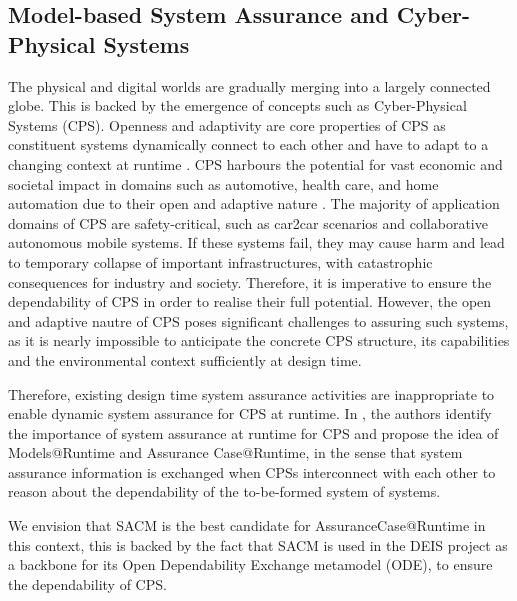 \subsection{Model-based System Assurance and Cyber-Physical Systems}

The physical and digital worlds are gradually merging into a largely connected globe. 
This is backed by the emergence of concepts such as Cyber-Physical Systems (CPS).
Openness and adaptivity are core properties of CPS as constituent systems dynamically connect to each other and have to adapt to a changing context at runtime \cite{trapp2013safety}.
CPS harbours the potential for vast economic and societal impact in domains such as automotive, health care, and home automation due to their open and adaptive nature \cite{wei2017deis}.
The majority of application domains of CPS are safety-critical, such as car2car scenarios and collaborative autonomous mobile systems.
If these systems fail, they may cause harm and lead to temporary collapse of important infrastructures, with catastrophic consequences for industry and society.
Therefore, it is imperative to ensure the dependability of CPS in order to realise their full potential. 
However, the open and adaptive nautre of CPS poses significant challenges to assuring such systems, as it is nearly impossible to anticipate the concrete CPS structure, its capabilities and the environmental context sufficiently at design time.

Therefore, existing design time system assurance activities are inappropriate to enable dynamic system assurance for CPS at runtime. 
In \cite{trapp2013safety}, the authors identify the importance of system assurance at runtime for CPS and propose the idea of Models@Runtime and Assurance Case@Runtime, in the sense that system assurance information is exchanged when CPSs interconnect with each other to reason about the dependability of the to-be-formed system of systems.

We envision that SACM is the best candidate for AssuranceCase@Runtime in this context, this is backed by the fact that SACM is used in the DEIS project \cite{wei2017deis} as a backbone for its Open Dependability Exchange metamodel (ODE), to ensure the dependability of CPS. 

%
